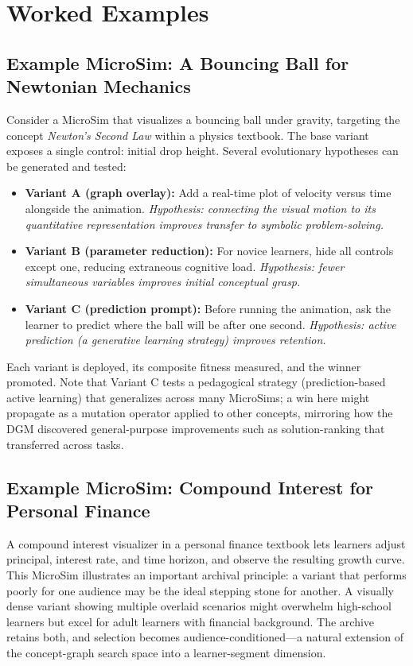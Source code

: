 \section{Worked Examples}

\subsection{Example MicroSim: A Bouncing Ball for Newtonian Mechanics}

Consider a MicroSim that visualizes a bouncing ball under gravity, targeting
the concept \textit{Newton's Second Law} within a physics textbook. The base
variant exposes a single control: initial drop height. Several evolutionary
hypotheses can be generated and tested:

\begin{itemize}
    \item \textbf{Variant A (graph overlay):} Add a real-time plot of velocity
          versus time alongside the animation. \textit{Hypothesis: connecting
          the visual motion to its quantitative representation improves transfer
          to symbolic problem-solving.}
    \item \textbf{Variant B (parameter reduction):} For novice learners, hide
          all controls except one, reducing extraneous cognitive load.
          \textit{Hypothesis: fewer simultaneous variables improves initial
          conceptual grasp.}
    \item \textbf{Variant C (prediction prompt):} Before running the animation,
          ask the learner to predict where the ball will be after one second.
          \textit{Hypothesis: active prediction (a generative learning
          strategy) improves retention.}
\end{itemize}

Each variant is deployed, its composite fitness measured, and the winner
promoted. Note that Variant C tests a pedagogical strategy (prediction-based
active learning) that generalizes across many MicroSims; a win here might
propagate as a mutation operator applied to other concepts, mirroring how the
DGM discovered general-purpose improvements such as solution-ranking that
transferred across tasks.

\subsection{Example MicroSim: Compound Interest for Personal Finance}

A compound interest visualizer in a personal finance textbook lets learners
adjust principal, interest rate, and time horizon, and observe the resulting
growth curve. This MicroSim illustrates an important archival principle: a
variant that performs poorly for one audience may be the ideal stepping stone
for another. A visually dense variant showing multiple overlaid scenarios might
overwhelm high-school learners but excel for adult learners with financial
background. The archive retains both, and selection becomes
audience-conditioned---a natural extension of the concept-graph search space
into a learner-segment dimension.

